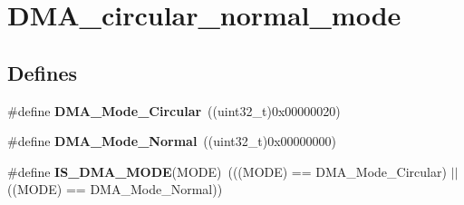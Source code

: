 \hypertarget{group__DMA__circular__normal__mode}{
\section{DMA\_\-circular\_\-normal\_\-mode}
\label{group__DMA__circular__normal__mode}
}
\subsection*{Defines}
\begin{DoxyCompactItemize}
\item 
\hypertarget{group__DMA__circular__normal__mode_ga36327b14c302098fbc5823ac3f1ae020}{
\#define {\bfseries DMA\_\-Mode\_\-Circular}~((uint32\_\-t)0x00000020)}
\label{group__DMA__circular__normal__mode_ga36327b14c302098fbc5823ac3f1ae020}

\item 
\hypertarget{group__DMA__circular__normal__mode_ga36400f5b5095f1102ede4760d7a5959c}{
\#define {\bfseries DMA\_\-Mode\_\-Normal}~((uint32\_\-t)0x00000000)}
\label{group__DMA__circular__normal__mode_ga36400f5b5095f1102ede4760d7a5959c}

\item 
\hypertarget{group__DMA__circular__normal__mode_gad88ee5030574d6a573904378fb62c7ac}{
\#define {\bfseries IS\_\-DMA\_\-MODE}(MODE)~(((MODE) == DMA\_\-Mode\_\-Circular) $|$$|$ ((MODE) == DMA\_\-Mode\_\-Normal))}
\label{group__DMA__circular__normal__mode_gad88ee5030574d6a573904378fb62c7ac}

\end{DoxyCompactItemize}
